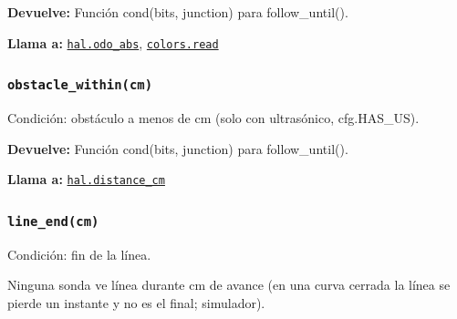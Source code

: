 \par{}\par\smallskip
\noindent\textbf{Devuelve:} Función cond(bits, junction) para follow\_until().\par
\noindent\textbf{Llama a:} \hyperref[fn:hal:odo-abs]{\texttt{hal.odo\_\allowbreak{}abs}}, \hyperref[fn:colors:read]{\texttt{colors.read}}\par

\subsubsection{\texttt{obstacle\_\allowbreak{}within(cm)}}\label{fn:linefollow:obstacle-within}
\noindent Condición: obstáculo a menos de cm (solo con ultrasónico, cfg.HAS\_US).

\par{}\par\smallskip
\noindent\textbf{Devuelve:} Función cond(bits, junction) para follow\_until().\par
\noindent\textbf{Llama a:} \hyperref[fn:hal:distance-cm]{\texttt{hal.distance\_\allowbreak{}cm}}\par

\subsubsection{\texttt{line\_\allowbreak{}end(cm)}}\label{fn:linefollow:line-end}
\noindent Condición: fin de la línea.

Ninguna sonda ve línea durante cm de avance (en una curva cerrada la línea se pierde un instante y no es el final; simulador).

